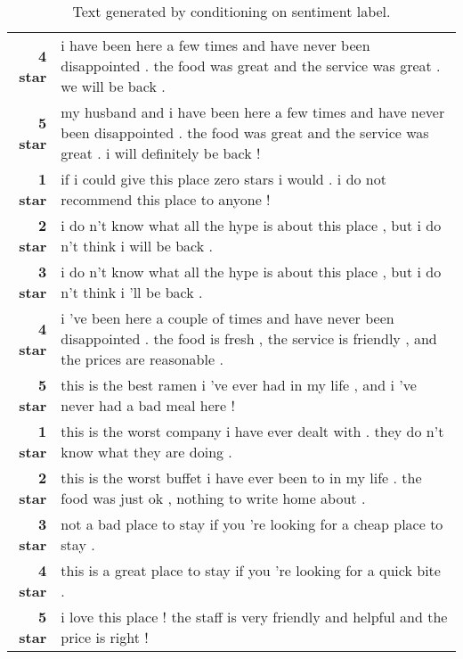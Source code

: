 \documentclass{article}
\begin{document}
\begin{table*}[!thbp]
\begin{tabular}{r  p{12cm}}
    {\bf 4 star} & i have been here a few times and have never been
                   disappointed . the food was great and the service was great
                   . we will be back . \\
    {\bf 5 star} & my husband and i have been here a few times and have never
                   been disappointed . the food was great and the service was
                   great . i will definitely be back ! \\
    \midrule
    {\bf 1 star} & if i could give this place zero stars i would . i do not
                   recommend this place to anyone ! \\
    {\bf 2 star} & i do n't know what all the hype is about this place , but i
                   do n't think i will be back . \\
    {\bf 3 star} & i do n't know what all the hype is about this place , but i
                   do n't think i 'll be back .\\
    {\bf 4 star} & i 've been here a couple of times and have never been
                   disappointed . the food is fresh , the service is friendly
                   , and the prices are reasonable . \\
    {\bf 5 star} & this is the best ramen i 've ever had in my life , and i 've
                   never had a bad meal here ! \\
    \midrule
    {\bf 1 star} & this is the worst company i have ever dealt with . they do
                   n't know what they are doing . \\
    {\bf 2 star} & this is the worst buffet i have ever been to in my life
                   . the food was just ok , nothing to write home about . \\
    {\bf 3 star} & not a bad place to stay if you 're looking for a cheap
                   place to stay . \\
    {\bf 4 star} & this is a great place to stay if you 're looking for a
                   quick bite . \\
    {\bf 5 star} & i love this place ! the staff is very friendly and helpful
                   and the price is right ! \\
    \bottomrule
  \end{tabular}
  \caption{Text generated by conditioning on sentiment label.}
  \label{tab:yelp_sample}
\end{table*}
\end{document}

